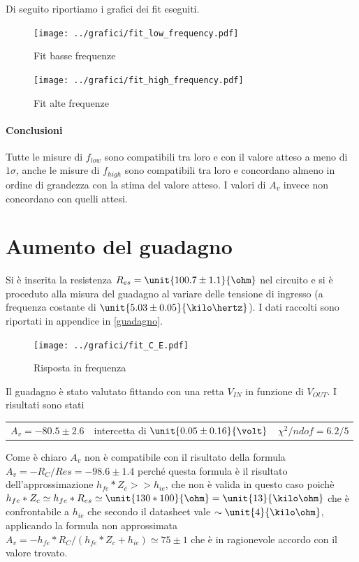 \documentclass[10pt,a4paper]{article}
\begin{document}
Di seguito riportiamo i grafici dei fit eseguiti.
\begin{figure}[h!]
	\centering
		\texttt{[image: ../grafici/fit\_low\_frequency.pdf]}
		\caption{Fit basse frequenze}
\end{figure}
\begin{figure}[h!]
	\centering
	\texttt{[image: ../grafici/fit\_high\_frequency.pdf]}
	\caption{Fit alte frequenze}
\end{figure}


\paragraph{Conclusioni}
Tutte le misure di $f_{low}$ sono compatibili tra loro e con il valore atteso a meno di $1\sigma$, anche le misure di $f_{high}$ sono compatibili tra loro e concordano almeno in ordine di grandezza con la stima del valore atteso. I valori di $A_v$ invece non concordano con quelli attesi.

\section{Aumento del guadagno}

Si è inserita la resistenza $R_{es} = \unit{100.7 \pm 1.1}{\ohm}$ nel circuito e si è proceduto alla misura del guadagno al variare delle tensione di ingresso (a frequenza costante di $\unit{5.03 \pm 0.05}{\kilo\hertz}$). I dati raccolti sono riportati in appendice in \tablename{\ref{guadagno}}.

\begin{figure}[h!]
	\centering
		\texttt{[image: ../grafici/fit\_C\_E.pdf]}
		\caption{Risposta in frequenza}
\end{figure}

Il guadagno è stato valutato fittando con una retta $V_{IN}$ in funzione di $V_{OUT}$. I risultati sono stati
\begin{table}[h!]
\centering 
\begin{tabular}{ccc}
$A_v = -80.5 \pm 2.6$ & intercetta di $\unit{0.05 \pm 0.16}{\volt}$ & $\chi^2/ndof = 6.2/5$
\end{tabular}
\end{table}

Come è chiaro $A_v$ non è compatibile con il risultato della formula $A_v = -R_C/Res = -98.6 \pm 1.4$ perché questa formula è il risultato dell'approssimazione $h_{fe}*Z_c >> h_{ie}$, che non è valida in questo caso poichè $h_{fe} * Z_c \simeq h_{fe} * R_{es} \simeq \unit{130 * 100}{\ohm} = \unit{13}{\kilo\ohm} $ che è confrontabile a $h_{ie}$ che secondo il datasheet vale $\sim \unit{4}{\kilo\ohm}$, applicando la formula non approssimata $A_v = -h_{fe}*R_C/(h_{fe}*Z_c + h_{ie}) \simeq 75 \pm 1$ che è in ragionevole accordo con il valore trovato.
\pagebreak
\end{document}
